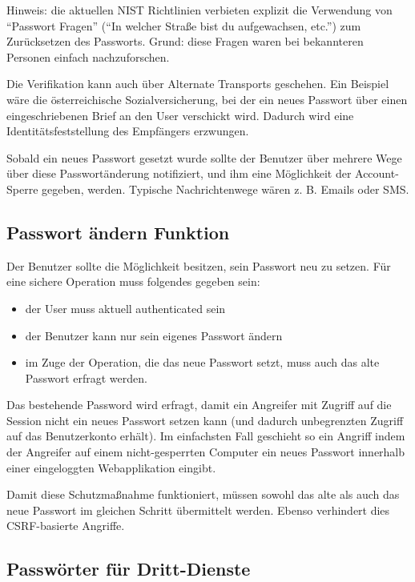 Hinweis: die aktuellen NIST Richtlinien verbieten explizit die Verwendung von ``Passwort Fragen'' (``In welcher Straße bist du aufgewachsen, etc.'') zum Zurücksetzen des Passworts. Grund: diese Fragen waren bei bekannteren Personen einfach nachzuforschen.

Die Verifikation kann auch über Alternate Transports geschehen. Ein Beispiel wäre die österreichische Sozialversicherung, bei der ein neues Passwort über einen eingeschriebenen Brief an den User verschickt wird. Dadurch wird eine Identitätsfeststellung des Empfängers erzwungen.

Sobald ein neues Passwort gesetzt wurde sollte der Benutzer über mehrere Wege über diese Passwortänderung notifiziert, und ihm eine Möglichkeit der Account-Sperre gegeben, werden. Typische Nachrichtenwege wären z. B. Emails oder SMS.

\subsection{Passwort ändern Funktion}

Der Benutzer sollte die Möglichkeit besitzen, sein Passwort neu zu setzen. Für eine sichere Operation muss folgendes gegeben sein:

\begin{itemize}
	\item der User muss aktuell authenticated sein
	\item der Benutzer kann nur sein eigenes Passwort ändern
	\item im Zuge der Operation, die das neue Passwort setzt, muss auch das alte Passwort erfragt werden.
\end{itemize}

Das bestehende Password wird erfragt, damit ein Angreifer mit Zugriff auf die Session nicht ein neues Passwort setzen kann (und dadurch unbegrenzten Zugriff auf das Benutzerkonto erhält). Im einfachsten Fall geschieht so ein Angriff indem der Angreifer auf einem nicht-gesperrten Computer ein neues Passwort innerhalb einer eingeloggten Webapplikation eingibt.

Damit diese Schutzmaßnahme funktioniert, müssen sowohl das alte als auch das neue Passwort im gleichen Schritt übermittelt werden. Ebenso verhindert dies CSRF-basierte Angriffe.

\subsection{Passwörter für Dritt-Dienste}


